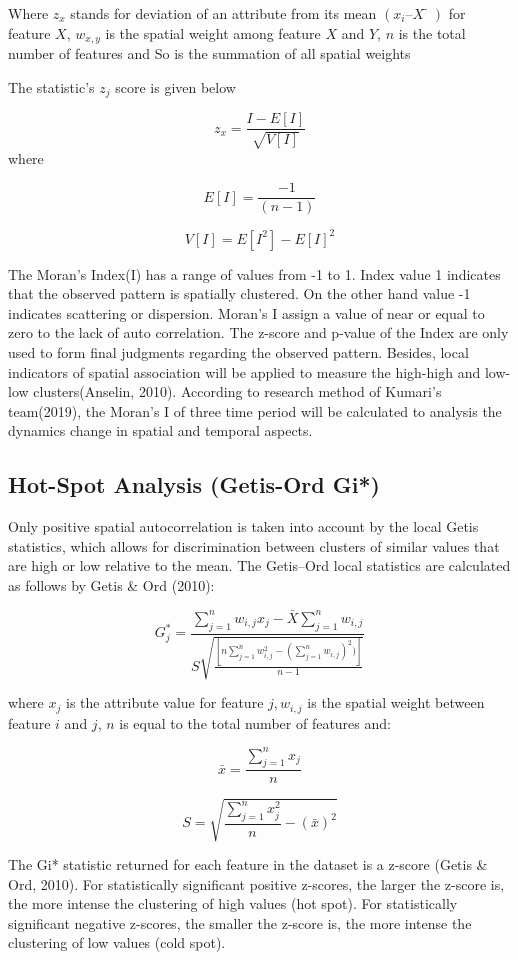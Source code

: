 \documentclass[
  12pt,
  oneside]{book}
\begin{document}
Where \(z_x\) stands for deviation of an attribute from its mean \((x_i – X̅)\) for feature \(X\), \(w_{x,y}\) is the spatial weight among feature \(X\) and \(Y\), \(n\) is the total number of features and So is the summation of all spatial weights

The statistic's \(z_j\) score is given below

\[ 
z_x = \frac{I - E[I]}{\sqrt{V[I]}}
\]
where

\[
E[I] = \frac{-1}{(n-1)}
\]

\[
V[I] = E[I^2]-E[I]^2
\]

The Moran's Index(I) has a range of values from -1 to 1. Index value 1 indicates that the observed pattern is spatially clustered. On the other hand value -1 indicates scattering or dispersion. Moran's I assign a value of near or equal to zero to the lack of auto correlation. The z-score and p-value of the Index are only used to form final judgments regarding the observed pattern. Besides, local indicators of spatial association will be applied to measure the high-high and low-low clusters(Anselin, 2010). According to research method of Kumari's team(2019), the Moran's I of three time period will be calculated to analysis the dynamics change in spatial and temporal aspects.

\hypertarget{hot-spot-analysis-getis-ord-gi}{%
\subsection{Hot-Spot Analysis (Getis-Ord Gi*)}\label{hot-spot-analysis-getis-ord-gi}}

Only positive spatial autocorrelation is taken into account by the local Getis statistics, which allows for discrimination between clusters of similar values that are high or low relative to the mean. The Getis--Ord local statistics are calculated as follows by Getis \& Ord (2010):

\[
G^*_j = \frac{\sum_{j=1}^nw_{i,j}x_j - \bar{X}\sum_{j=1}^{n}w_{i,j}}{S\sqrt{\frac{[n\sum_{j=1}^{n}w^2_{i,j} - (\sum_{j=1}^{n}w_{i,j})^2)]}{n-1}}}
\]

where \(x_j\) is the attribute value for feature \(j, w_{i,j}\) is the spatial weight between feature \(i\) and \(j\), \(n\) is equal to the total number of features and:

\[ 
\bar{x} = \frac{\sum_{j=1}^{n}x_j}{n}
\]

\[
S = \sqrt{\frac{\sum_{j=1}^{n}x^2_j}{n} -(\bar{x})^2}
\]

The Gi* statistic returned for each feature in the dataset is a z-score (Getis \& Ord, 2010). For statistically significant positive z-scores, the larger the z-score is, the more intense the clustering of high values (hot spot). For statistically significant negative z-scores, the smaller the z-score is, the more intense the clustering of low values (cold spot).
\end{document}
